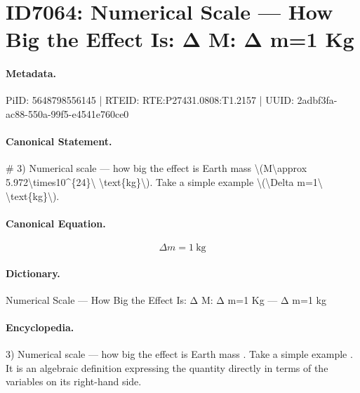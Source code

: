 \section*{ID7064: Numerical Scale — How Big the Effect Is: Δ M: Δ m=1 Kg}
\paragraph{Metadata.}
PiID: 5648798556145 | RTEID: RTE:P27431.0808:T1.2157 | UUID: 2adbf3fa-ac88-550a-99f5-e4541e760ce0

\paragraph{Canonical Statement.}
\# 3) Numerical scale — how big the effect is Earth mass \textbackslash{}(M\textbackslash{}approx 5.972\textbackslash{}times10\textasciicircum{}\{24\}\textbackslash{} \textbackslash{}text\{kg\}\textbackslash{}). Take a simple example \textbackslash{}(\textbackslash{}Delta m=1\textbackslash{} \textbackslash{}text\{kg\}\textbackslash{}).

\paragraph{Canonical Equation.}
\[
\Delta m=1\ \text{kg}
\]

\paragraph{Dictionary.}
Numerical Scale — How Big the Effect Is: Δ M: Δ m=1 Kg — Δ m=1 kg

\paragraph{Encyclopedia.}
3) Numerical scale — how big the effect is Earth mass . Take a simple example . It is an algebraic definition expressing the quantity directly in terms of the variables on its right-hand side.
